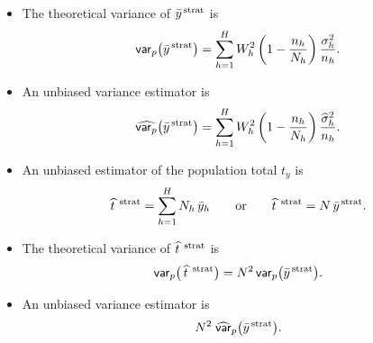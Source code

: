 \documentclass{my_eth_beamer}
\numberwithin{equation}{section}
\begin{document}
\setcounter{equation}{\the\numexpr\value{equation}+1\relax}

\begin{frame}
    \begin{itemize}
    \setlength{\itemsep}{12pt}
        \item The theoretical \alert{variance} of $\bar{y}^{\, \mathrm{strat}}$ is
            \begin{equation}\label{eq:strat_var_mean}
                \mathsf{var}_p\big(\bar{y}^{\, \mathrm{strat}}\big) = \sum_{h = 1}^H W_h^2
                    \left(1 - \frac{n_h}{N_{h}}\right) \frac{\sigma_{h}^2}{n_h}.
            \end{equation}
        \item An unbiased \alert{variance estimator} is
            \begin{equation*}
                \widehat{\mathsf{var}_p}\big(\bar{y}^{\, \mathrm{strat}}\big) = \sum_{h = 1}^H W_h^2
                    \left(1 - \frac{n_h}{N_{h}}\right) \frac{\widehat{\sigma}_{h}^2}{n_h}.
            \end{equation*}
        \item An unbiased estimator of the \alert{population total} $t_y$ is
            \begin{equation*}
                \widehat{t}^{\;\, \mathrm{strat}} = \sum_{h = 1}^H N_{h} \, \bar{y}_h \qquad \text{or}
                    \qquad \widehat{t}^{\;\, \mathrm{strat}} = N \, \bar{y}^{\, \mathrm{strat}}.
            \end{equation*}
    \end{itemize}
\end{frame}

\begin{frame}
    \begin{itemize}
    \setlength{\itemsep}{14pt}
        \item The \alert{theoretical} variance of $\widehat{t}^{\;\, \mathrm{strat}}$ is
            \begin{equation*}
                \mathsf{var}_p\big(\,\widehat{t}^{\;\, \mathrm{strat}}\big) = N^2 \,\mathsf{var}_p\big(\bar{y}^{\, \mathrm{strat}}\big).
            \end{equation*}
        \item An unbiased \alert{variance estimator} is
            \begin{equation*}
                N^2 \; \widehat{\mathsf{var}}_p\big(\bar{y}^{\, \mathrm{strat}}\big).
            \end{equation*}
    \end{itemize}
\end{frame}
\end{document}
